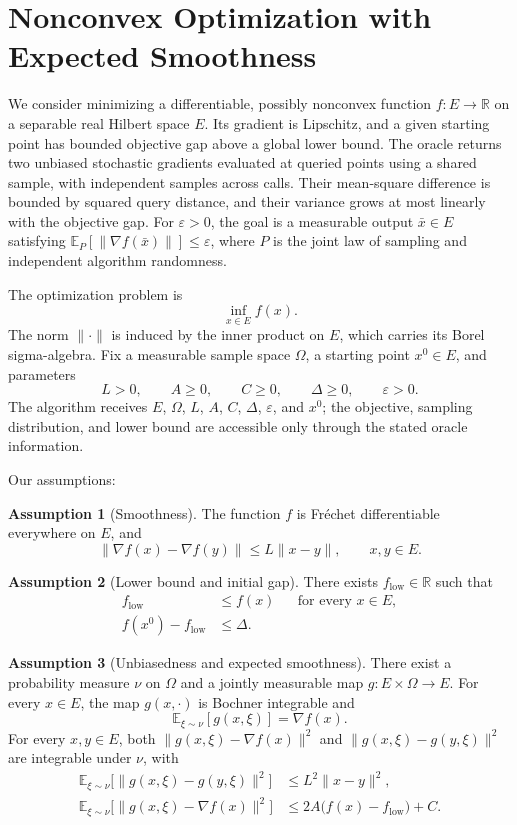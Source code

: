 \documentclass[10pt]{article}
\theoremstyle{definition}
\newtheorem{assumption}{Assumption}
\begin{document}
\section*{Nonconvex Optimization with Expected Smoothness}
We consider minimizing a differentiable, possibly nonconvex function $f:E\to\mathbb{R}$ on a separable real Hilbert space $E$. Its gradient is Lipschitz, and a given starting point has bounded objective gap above a global lower bound. The oracle returns two unbiased stochastic gradients evaluated at queried points using a shared sample, with independent samples across calls. Their mean-square difference is bounded by squared query distance, and their variance grows at most linearly with the objective gap. For $\varepsilon>0$, the goal is a measurable output $\bar{x}\in E$ satisfying $\mathbb{E}_{P}[\|\nabla f(\bar{x})\|]\leq\varepsilon$, where $P$ is the joint law of sampling and independent algorithm randomness.

The optimization problem is
\[
\inf_{x\in E} f(x).
\]
The norm $\|\cdot\|$ is induced by the inner product on $E$, which carries its Borel sigma-algebra. Fix a measurable sample space $\Omega$, a starting point $x^0\in E$, and parameters
\[
L>0,\qquad A\geq0,\qquad C\geq0,\qquad
\Delta\geq0,\qquad \varepsilon>0.
\]
The algorithm receives $E$, $\Omega$, $L$, $A$, $C$, $\Delta$, $\varepsilon$, and $x^0$; the objective, sampling distribution, and lower bound are accessible only through the stated oracle information.

Our assumptions:
\begin{assumption}[Smoothness]
The function $f$ is Fr\'echet differentiable everywhere on $E$, and
\[
\|\nabla f(x)-\nabla f(y)\|\leq L\|x-y\|,
\qquad x,y\in E.
\]
\end{assumption}

\begin{assumption}[Lower bound and initial gap]
There exists $f_{\mathrm{low}}\in\mathbb{R}$ such that
\[
\begin{aligned}
f_{\mathrm{low}}&\leq f(x) &&\text{for every }x\in E,\\
f(x^0)-f_{\mathrm{low}}&\leq\Delta.
\end{aligned}
\]
\end{assumption}

\begin{assumption}[Unbiasedness and expected smoothness]
There exist a probability measure $\nu$ on $\Omega$ and a jointly measurable map $g:E\times\Omega\to E$. For every $x\in E$, the map $g(x,\cdot)$ is Bochner integrable and
\[
\mathbb{E}_{\xi\sim\nu}[g(x,\xi)]=\nabla f(x).
\]
For every $x,y\in E$, both $\|g(x,\xi)-\nabla f(x)\|^2$ and $\|g(x,\xi)-g(y,\xi)\|^2$ are integrable under $\nu$, with
\[
\begin{aligned}
\mathbb{E}_{\xi\sim\nu}\bigl[\|g(x,\xi)-g(y,\xi)\|^2\bigr]
&\leq L^2\|x-y\|^2,\\
\mathbb{E}_{\xi\sim\nu}\bigl[\|g(x,\xi)-\nabla f(x)\|^2\bigr]
&\leq 2A\bigl(f(x)-f_{\mathrm{low}}\bigr)+C.
\end{aligned}
\]
\end{assumption}
\end{document}
